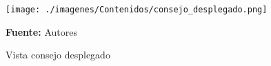 \begin{figure}[!htb]
  \begin{center}
\texttt{[image: ./imagenes/Contenidos/consejo\_desplegado.png]}
    \caption{Vista consejo desplegado}
    \label{fig:Vista_consejo_desplegado}
    \textbf{Fuente:}  Autores
  \end{center}
\end{figure}
